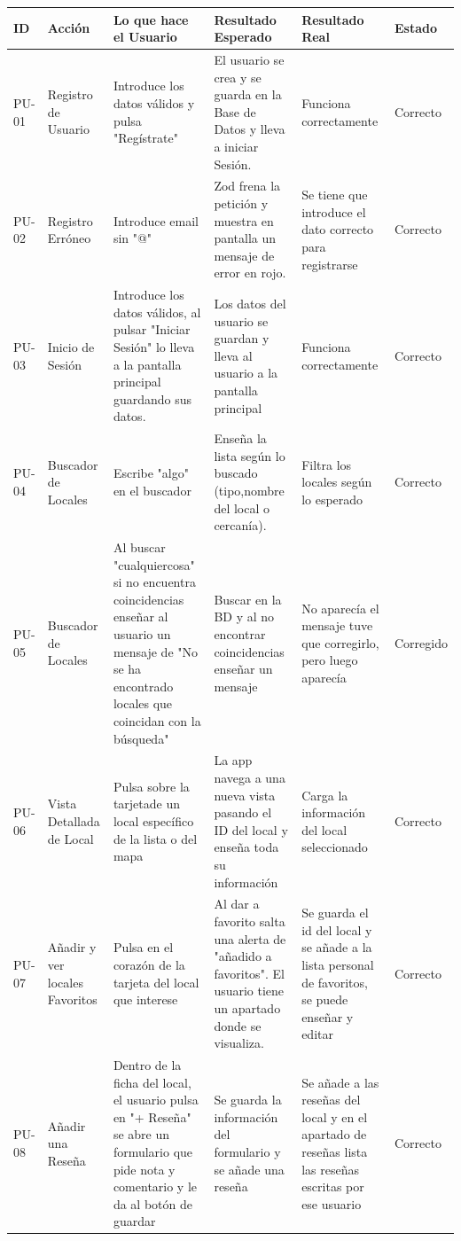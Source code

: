 \documentclass[a4paper,11pt]{article}
\begin{document}
\begin{table}[H]
    \centering
    \begin{tabular}{|p{1.3cm}|p{1.5cm}|p{3.5cm}|p{3.5cm}|p{3cm}|p{1.5cm}|}
    \hline
    ID & Acción & Lo que hace el Usuario & Resultado Esperado & Resultado Real & Estado \\ \hline
    PU-01 & Registro de Usuario & Introduce los datos válidos y pulsa "Regístrate" & El usuario se crea y se guarda en la Base de Datos y lleva a iniciar Sesión. & Funciona correctamente & Correcto \\ \hline
    PU-02 & Registro Erróneo & Introduce email sin "@" & Zod frena la petición y muestra en pantalla un mensaje de error en rojo. & Se tiene que introduce el dato correcto para registrarse & Correcto \\ \hline
    PU-03 & Inicio de Sesión & Introduce los datos válidos, al pulsar "Iniciar Sesión" lo lleva a la pantalla principal guardando sus datos. & Los datos del usuario se guardan y lleva al usuario a la pantalla principal & Funciona correctamente & Correcto \\ \hline
    PU-04 & Buscador de Locales & Escribe "algo" en el buscador & Enseña la lista según lo buscado (tipo,nombre del local o cercanía). & Filtra los locales según lo esperado & Correcto  \\ \hline
    PU-05 & Buscador de Locales & Al buscar "cualquiercosa" si no encuentra coincidencias enseñar al usuario un mensaje de "No se ha encontrado locales que coincidan con la búsqueda" &  Buscar en la BD y al no encontrar coincidencias enseñar un mensaje & No aparecía el mensaje tuve que corregirlo, pero luego aparecía & Corregido  \\ \hline
    PU-06 & Vista Detallada de Local & Pulsa sobre la tarjetade un local específico de la lista o del mapa & La app navega a una nueva vista pasando el ID del local y enseña toda su información & Carga la información del local seleccionado & Correcto \\ \hline
    PU-07 & Añadir y ver locales Favoritos & Pulsa en el corazón de la tarjeta del local que interese & Al dar a favorito salta una alerta de "añadido a favoritos". El usuario tiene un apartado donde se visualiza. & Se guarda el id del local y se añade a la lista personal de favoritos, se puede enseñar y editar & Correcto \\ \hline
    PU-08 & Añadir una Reseña & Dentro de la ficha del local, el usuario pulsa en "+ Reseña" se abre un formulario que pide nota y comentario y le da al botón de guardar & Se guarda la información del formulario y se añade una reseña & Se añade a las reseñas del local y en el apartado de reseñas lista las reseñas escritas por ese usuario & Correcto \\ \hline

\end{tabular}
\end{table}
\end{document}
